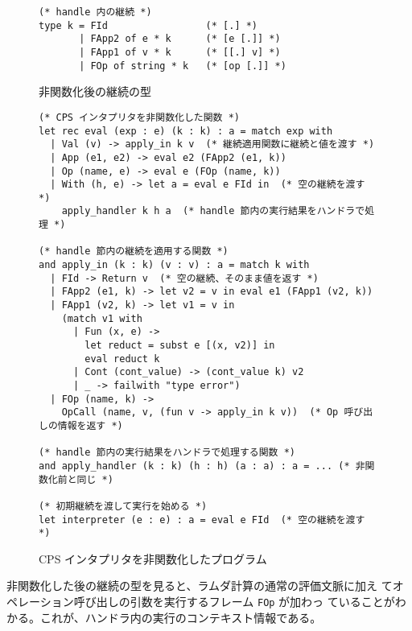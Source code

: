
\begin{figure}
\begin{spacing}{0.8}
\begin{verbatim}
(* handle 内の継続 *)
type k = FId                 (* [.] *)
       | FApp2 of e * k      (* [e [.]] *)
       | FApp1 of v * k      (* [[.] v] *)
       | FOp of string * k   (* [op [.]] *)
\end{verbatim}
\end{spacing}
\caption{非関数化後の継続の型}
\label{figure:k_2defun}
\end{figure}

\begin{figure}
\begin{spacing}{0.8}
\begin{verbatim}
(* CPS インタプリタを非関数化した関数 *)
let rec eval (exp : e) (k : k) : a = match exp with
  | Val (v) -> apply_in k v  (* 継続適用関数に継続と値を渡す *)
  | App (e1, e2) -> eval e2 (FApp2 (e1, k))
  | Op (name, e) -> eval e (FOp (name, k))
  | With (h, e) -> let a = eval e FId in  (* 空の継続を渡す *)
    apply_handler k h a  (* handle 節内の実行結果をハンドラで処理 *)

(* handle 節内の継続を適用する関数 *)
and apply_in (k : k) (v : v) : a = match k with
  | FId -> Return v  (* 空の継続、そのまま値を返す *)
  | FApp2 (e1, k) -> let v2 = v in eval e1 (FApp1 (v2, k))
  | FApp1 (v2, k) -> let v1 = v in
    (match v1 with
      | Fun (x, e) ->
        let reduct = subst e [(x, v2)] in
        eval reduct k
      | Cont (cont_value) -> (cont_value k) v2
      | _ -> failwith "type error")
  | FOp (name, k) ->
    OpCall (name, v, (fun v -> apply_in k v))  (* Op 呼び出しの情報を返す *)

(* handle 節内の実行結果をハンドラで処理する関数 *)
and apply_handler (k : k) (h : h) (a : a) : a = ... (* 非関数化前と同じ *)

(* 初期継続を渡して実行を始める *)
let interpreter (e : e) : a = eval e FId  (* 空の継続を渡す *)
\end{verbatim}
\end{spacing}
\caption{CPS インタプリタを非関数化したプログラム}
\label{figure:2defun}
\end{figure}

非関数化した後の継続の型を見ると、ラムダ計算の通常の評価文脈に加え
てオペレーション呼び出しの引数を実行するフレーム \texttt{FOp} が加わっ
ていることがわかる。これが、ハンドラ内の実行のコンテキスト情報である。

